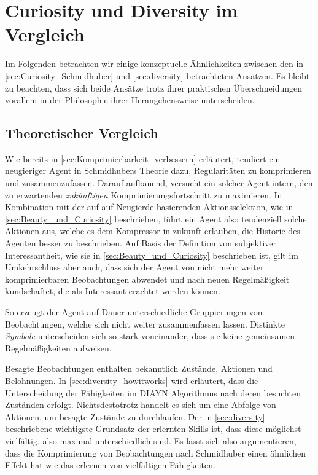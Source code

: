 \section{Curiosity und Diversity im Vergleich}
\label{sec:comparison}
Im Folgenden betrachten wir einige konzeptuelle Ähnlichkeiten zwischen den in \ref{sec:Curiosity_Schmidhuber} und \ref{sec:diversity} betrachteten Ansätzen.
Es bleibt zu beachten, dass sich beide Ansätze trotz ihrer praktischen Überschneidungen vorallem in der Philosophie ihrer Herangehensweise unterscheiden.

\subsection{Theoretischer Vergleich}
\label{sec:comparison_theory}

Wie bereits in \ref{sec:Komprimierbarkeit_verbessern} erläutert, tendiert ein neugieriger Agent in Schmidhubers Theorie dazu, Regularitäten zu komprimieren und zusammenzufassen. Darauf aufbauend, versucht ein solcher Agent intern, den zu erwartenden \emph{zukünftigen} Komprimierungsfortschritt zu maximieren. 
In Kombination mit der auf auf Neugierde basierenden Aktionsselektion, wie in \ref{sec:Beauty_und_Curiosity} beschrieben, führt ein Agent also tendenziell solche Aktionen aus, welche es dem Kompressor in zukunft erlauben, die Historie des Agenten besser zu beschrieben. 
Auf Basis der Definition von subjektiver Interessantheit, wie sie in \ref{sec:Beauty_und_Curiosity} beschrieben ist, gilt im Umkehrschluss aber auch, dass sich der Agent von nicht mehr weiter komprimierbaren Beobachtungen abwendet und nach neuen Regelmäßigkeit kundschaftet, die als Interessant erachtet werden können.

So erzeugt der Agent auf Dauer unterschiedliche Gruppierungen von Beobachtungen, welche sich nicht weiter zusammenfassen lassen. Distinkte \emph{Symbole} unterscheiden sich so stark voneinander, dass sie keine gemeinsamen Regelmäßigkeiten aufweisen.

Besagte Beobachtungen enthalten bekanntlich Zustände, Aktionen und Belohnungen. In \ref{sec:diversity_howitworks} wird erläutert, dass die Unterscheidung der Fähigkeiten im DIAYN Algorithmus nach deren besuchten Zuständen erfolgt. Nichtsdestotrotz handelt es sich um eine Abfolge von Aktionen, um besagte Zustände zu durchlaufen. Der in \ref{sec:diversity} beschriebene wichtigste Grundsatz der erlernten Skills ist, dass diese möglichst vielfältig, also maximal unterschiedlich sind. Es lässt sich also argumentieren, dass die Komprimierung von Beobachtungen nach Schmidhuber einen ähnlichen Effekt hat wie das erlernen von vielfältigen Fähigkeiten.

